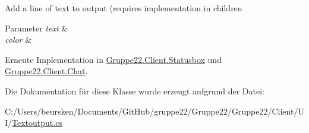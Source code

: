 Add a line of text to output (requires implementation in children 


\begin{DoxyParams}{Parameter}
{\em text} & \\
\hline
{\em color} & \\
\hline
\end{DoxyParams}


Erneute Implementation in \hyperlink{class_gruppe22_1_1_client_1_1_statusbox_a5b23e66c24de79d0a274577d63a6ad74}{Gruppe22.\-Client.\-Statusbox} und \hyperlink{class_gruppe22_1_1_client_1_1_chat_a4caef8eac20c6ac2094ca85de9ce2404}{Gruppe22.\-Client.\-Chat}.



Die Dokumentation für diese Klasse wurde erzeugt aufgrund der Datei\-:\begin{DoxyCompactItemize}
\item 
C\-:/\-Users/beursken/\-Documents/\-Git\-Hub/gruppe22/\-Gruppe22/\-Gruppe22/\-Client/\-U\-I/\hyperlink{_textoutput_8cs}{Textoutput.\-cs}\end{DoxyCompactItemize}
